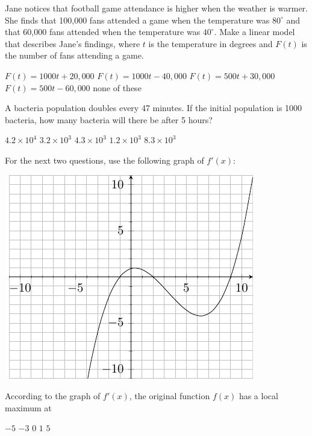\documentclass[11pt]{article}
\begin{document}
\begin{questions}
\begin{multiplechoice}{5}
\question Jane notices that football game attendance is higher when the weather is warmer.  She finds that 100,000 fans attended a game when the temperature was $80^\circ$ and that 60,000 fans attended when the temperature was $40^\circ$.  Make a linear model that describes Jane's findings, where $t$ is the temperature in degrees and $F(t)$ is the number of fans attending a game.
\begin{answers}{3}
\ans $F(t) = 1000t+20,000$
\ans $F(t) = 1000t-40,000$
\ans $F(t) = 500t+30,000$
\ans $F(t) = 500t - 60,000$
\ans none of these
\end{answers}


\question A bacteria population doubles every 47 minutes.  If the initial population is 1000 bacteria, how many bacteria will there be after 5 hours?
\begin{answers}{3}
\ans $4.2 \times 10^4$
\ans $3.2 \times 10^3$
\ans $4.3 \times 10^3$
\ans $1.2 \times 10^3$
\ans $8.3 \times 10^3$
\end{answers}




For the next two questions, use the following graph of $f'(x)$:\\


\begin{minipage}{\linewidth}%
\centering
\makebox[\linewidth]{}
\includegraphics{exam2graph1.pdf}
\label{graph1exam1}%
\end{minipage}


\question According to the graph of $f'(x)$, the original function $f(x)$ has a local maximum at
\begin{answers}{3}
\ans $-5$
\ans $-3$
\ans $0$
\ans $1$
\ans $5$
\end{answers}



\end{multiplechoice}
\end{questions}
\end{document}
